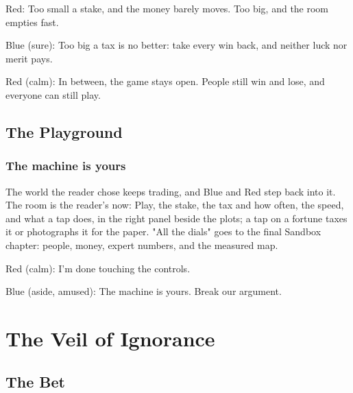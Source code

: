 
Red: Too small a stake, and the money barely moves.
Too big, and the room empties fast.

Blue (sure): Too big a tax is no better:
take every win back, and neither luck nor merit pays.

Red (calm): In between, the game stays open.
People still win and lose, and everyone can still play.

\section{The Playground}\label{index:playground}

\subsection{The machine is yours}\label{act:sandbox}

\label{sandbox}

The world the reader chose keeps trading, and Blue and Red step back into
it. The room is the reader's now: Play, the stake, the tax and how often,
the speed, and what a tap does, in the right panel beside the plots; a tap on
a fortune taxes it or photographs it for the paper. "All the dials" goes to
the final Sandbox chapter: people, money, expert numbers, and the measured map.


Red (calm): I'm done touching the controls.

Blue (aside, amused): The machine is yours. Break our argument.

\chapter{The Veil of Ignorance}\label{chapter:verdict}

\section{The Bet}\label{index:bet}

